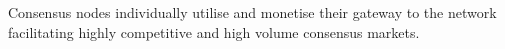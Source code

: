 





Consensus nodes individually utilise and monetise their gateway to the network facilitating highly competitive and high volume consensus markets.